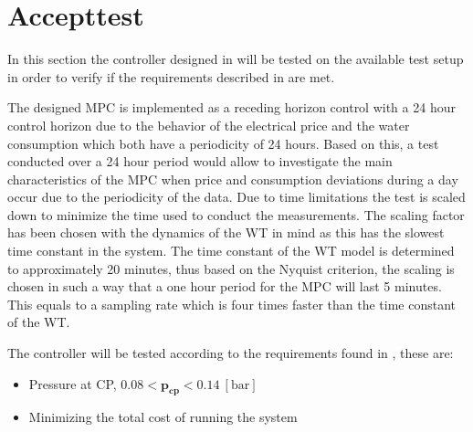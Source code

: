 \chapter{Accepttest}
\label{accepttest}

In this section the controller designed in  will be tested on the available test setup in order to verify if the requirements described in  are met. 

The designed MPC is implemented as a receding horizon control with a 24 hour control horizon due to the behavior of the electrical price and the water consumption which both have a periodicity of 24 hours. 
Based on this, a test conducted over a 24 hour period would allow to investigate the main characteristics of the MPC when price and consumption deviations during a day occur due to the periodicity of the data.   
Due to time limitations the test is scaled down to minimize the time used to conduct the measurements. 
The scaling factor has been chosen with the dynamics of the WT in mind as this has the slowest time constant in the system. 
The time constant of the WT model is determined to approximately 20 minutes, thus based on the Nyquist criterion, the scaling is chosen in such a way that a one hour period for the MPC will last 5 minutes. This equals to a sampling rate which is four times faster than the time constant of the WT. 

The controller will be tested according to the requirements found in , these are: 
\begin{itemize}
	\item Pressure at CP, $0.08 < \pmb{p_{cp}} < 0.14 \:[\text{bar}]$
%
	\item Minimizing the total cost of running the system
\end{itemize}    